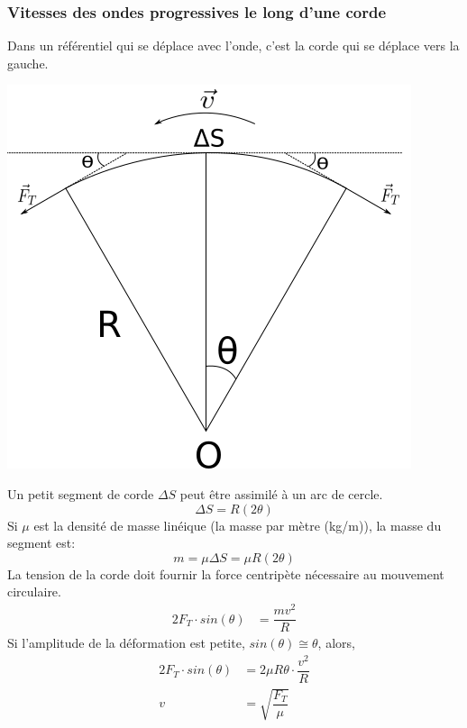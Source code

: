 \documentclass[11pt]{article}
\begin{document}
\subsubsection{Vitesses des ondes progressives le long d'une corde}
Dans un référentiel qui se déplace avec l'onde, c'est la corde qui se déplace vers la gauche.
\begin{center}
\includegraphics[scale = 0.75]{vitesseOndeProgCord.png}\\
\end{center}
Un petit segment de corde $\Delta S$ peut être assimilé à un arc de cercle.
\begin{equation}
    \Delta S = R(2 \theta)
\end{equation}
Si $\mu$ est la densité de masse linéique (la masse par mètre (kg/m)), la masse du segment est:
\begin{equation}
    m=\mu \Delta S= \mu R(2\theta)
\end{equation}
La tension de la corde doit fournir la force centripète nécessaire au mouvement circulaire.
\begin{equation}
    \begin{split}
        2F_T \cdot sin(\theta) &= \dfrac{mv^2}{R}
    \end{split}
\end{equation}
Si l'amplitude de la déformation est petite, $sin(\theta)\cong \theta$, alors,
\begin{equation}
    \begin{split}
        2F_T \cdot sin(\theta) &=  2\mu R \theta \cdot \dfrac{v^2}{R}\\
        v &= \sqrt{\dfrac{F_T}{\mu}}
    \end{split}
\end{equation}
\end{document}
